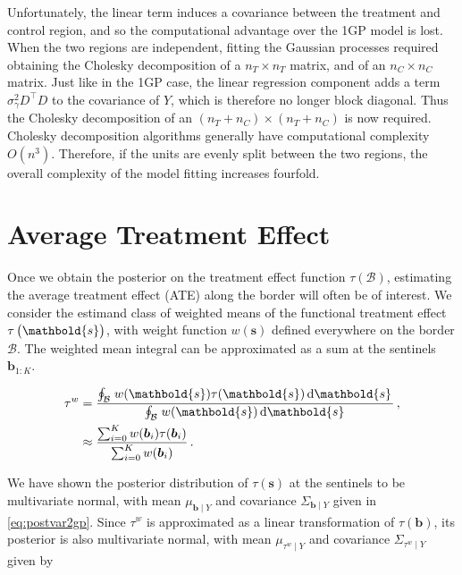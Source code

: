 \documentclass[letter]{article}
\newcommand{\trans}{^{\intercal}}
\newcommand{\sigmagamma}{\sigma_{\gamma}}
\newcommand{\svec}{\mathbold{s}}
\newcommand{\boundary}{\mathcal{B}}
\newcommand{\sentinels}{\bm{b}}
\newcommand{\tauw}{\tau^{w}}
\newcommand{\eqlabel}[1]{\label{#1}}
\begin{document}
Unfortunately, the linear term induces a covariance between the treatment and control region, and so the computational advantage over the 1GP model is lost.
When the two regions are independent, fitting the Gaussian processes required obtaining the Cholesky decomposition of a \(n_T \times n_T\) matrix, and of an \(n_C \times n_C\) matrix.
Just like in the 1GP case, the linear regression component adds a term \(\sigmagamma^2 D\trans D\) to the covariance of \(Y\), which is therefore no longer block diagonal.
Thus the Cholesky decomposition of an \((n_T+n_C) \times (n_T+n_C)\) is now required.
Cholesky decomposition algorithms generally have computational complexity \(O(n^3)\).
Therefore, if the units are evenly split between the two regions,
the overall complexity of the model fitting increases fourfold.
    


    	\section{Average Treatment Effect}\label{average-treatment-effect}
    

\label{sec:ate}
    	Once we obtain the posterior on the treatment effect function \(\tau(\boundary)\), estimating the average treatment effect (ATE) along the border will often be of interest.
We consider the estimand class of weighted means of the functional treatment effect \(\tau\del{\svec}\),
with weight function \(w(\svec)\) defined everywhere on the border \(\boundary\).
The weighted mean integral can be approximated as a sum at the sentinels \(\sentinels_{1:K}\).

\begin{equation}\begin{split}
    \tauw &= \frac{\oint_\boundary \left. w(\svec) \tau(\svec) \dif \svec \right.}
                  {\oint_\boundary \left. w(\svec) \dif \svec \right.}\,,\\
          &\approx \frac{\sum_{i=0}^K w(\sentinels_i) \tau(\sentinels_i)}
                       {\sum_{i=0}^K w(\sentinels_i) } \,.
\end{split}
\eqlabel{eq:weighted_estimand}
\end{equation}

We have shown the posterior distribution of \(\tau(\svec)\) at the sentinels to be multivariate normal, with mean \(\mu_{\sentinels \mid Y}\) and covariance \(\Sigma_{\sentinels \mid Y}\) given in \eqref{eq:postvar2gp}.
Since \(\tauw\) is approximated as a linear transformation of \(\tau(\sentinels)\), its posterior is also multivariate normal, with mean \(\mu_{\tauw \mid Y}\) and covariance \(\Sigma_{\tauw \mid Y}\) given by
\end{document}
